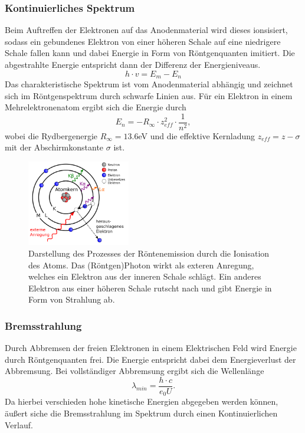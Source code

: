 \subsubsection*{Kontinuierliches Spektrum}
Beim Auftreffen der Elektronen auf das Anodenmaterial wird dieses ionsisiert, sodass
ein gebundenes Elektron von einer höheren Schale auf eine niedrigere Schale fallen kann und dabei
Energie in Form von Röntgenquanten imitiert. Die abgestrahlte Energie entspricht dann der Differenz
der Energieniveaus.
\begin{equation}
    h\cdot v=E_m-E_n
\end{equation}
Das charakteristische Spektrum ist vom Anodenmaterial abhängig und zeichnet sich im
Röntgenspektrum durch schwarfe Linien aus.
Für ein Elektron in einem Mehrelektronenatom ergibt sich die Energie durch
\begin{equation}
    E_n=-R_{\infty}\cdot z_{eff}^2 \cdot \frac{1}{n^2},
\end{equation}
wobei die Rydbergenergie $R_{\infty}=13.6$eV und die effektive Kernladung 
$z_{eff}=z-\sigma$ mit der Abschirmkonstante $\sigma$ ist.
\begin{figure}
    \centering
    \includegraphics[width=0.4\textwidth]{plots/chS.png}
    \caption{Darstellung des Prozesses der Röntenemission durch die
    Ionisation des Atoms. Das (Röntgen)Photon wirkt als exteren Anregung, welches
    ein Elektron aus der inneren Schale schlägt. Ein anderes Elektron aus einer
    höheren Schale rutscht nach und gibt Energie in Form von Strahlung ab.\cite{wiki}}
\end{figure}
\subsubsection*{Bremsstrahlung}
Durch Abbremsen der freien Elektronen in einem Elektrischen Feld 
wird Energie durch Röntgenquanten frei. Die Energie entspricht dabei
dem Energieverlust der Abbremsung. Bei vollständiger Abbremsung ergibt
sich die Wellenlänge
\begin{equation}
    \lambda_{min}=\frac{h \cdot c}{e_0U}.
    \label{eqn:minW}
\end{equation}
Da hierbei verschieden hohe kinetische Energien abgegeben werden können,
äußert siche die Bremsstrahlung im Spektrum durch einen Kontinuierlichen
Verlauf.
